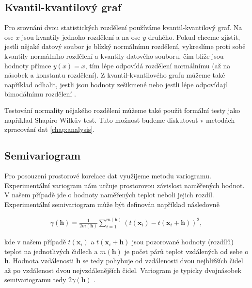 \subsection{Kvantil-kvantilový graf}
Pro srovnání dvou statistických rozdělení používáme kvantil-kvantilový graf. Na ose $x$ jsou kvantily jednoho rozdělení a na ose $y$ druhého. Pokud chceme zjistit, jestli nějaké datový soubor je blízký normálnímu rozdělení, vykreslíme proti sobě kvantily normálního rozdělení a kvantily datového souboru, čím blíže jsou hodnoty přímce $y(x)=x$, tím lépe odpovídá rozdělení normálnímu (až na násobek a konstantu rozdělení). Z kvantil-kvantilového grafu můžeme také například odhalit, jestli jsou hodnoty zešikmené nebo jestli lépe odpovídají bimodálnímu rozdělení \parencite{interpretqqplot}.

Testování normality nějakého rozdělení můžeme také použít formální testy jako například Shapiro-Wilkův test. Tuto možnost budeme diskutovat v metodách zpracování dat \ref{chap:analysis}. %

\subsection{Semivariogram}\label{chap:variogram}
Pro posouzení prostorové korelace dat využijeme metodu variogramu. Experimentální variogram nám určuje prostorovou závislost naměřených hodnot. V našem případě jde o hodnoty naměřených teplot neboli jejich rozdíl. Experimentální semivariogram může být definován například následovně

\begin{gather*}
	\gamma(\mathbf{h}) = \frac{1}{2m(\mathbf{h})}\sum_{i=1}^{m(\mathbf{h})}\left(t(\mathbf{x}_i) - t(\mathbf{x}_i+\mathbf{h})\right)^2,
\end{gather*}

kde v našem případě $t(\mathbf{x}_i)$ a $t(\mathbf{x}_i+\mathbf{h})$ jsou pozorované hodnoty (rozdílů) teplot na jednotlivých čidlech a $m(\mathbf{h})$ je počet párů teplot vzdálených od sebe o $\mathbf{h}$. Hodnota vzdálenosti $\mathbf{h}$ se tedy pohybuje od vzdálenosti dvou nejbližších čidel až po vzdálenost dvou nejvzdálenějších čidel. Variogram je typicky dvojnásobek semivariogramu tedy $2\gamma(\mathbf{h})$ \parencite{variogram}.

